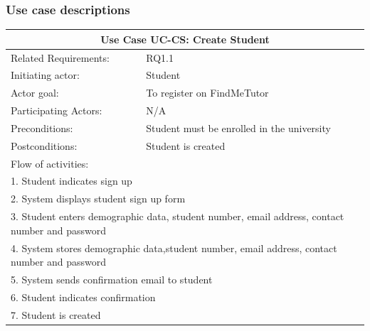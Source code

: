 \documentclass[12pt]{article}
\begin{document}
\subsubsection{Use case descriptions}

		\centering



		\begin{tabular}{| l | l| }
			\hline\multicolumn{2}{|c|}{ \textbf{Use Case UC-CS: Create Student}} \\ \hline
			Related Requirements: & RQ1.1 \\ \hline
			Initiating actor: & Student \\ \hline
			Actor goal: & To register on FindMeTutor\\ \hline
			Participating Actors: &N/A\\ \hline
			Preconditions: & Student must be enrolled in the university\\ \hline
			Postconditions: & Student is created\\ \hline
			\multicolumn{2}{|l|}{Flow of activities:}\\ \hline
			\multicolumn{2}{|p{15cm}|}{1. Student indicates sign up}\\
			\multicolumn{2}{|p{15cm}|}{2. System displays student sign up form}\\
			\multicolumn{2}{|p{15cm}|}{3. Student enters demographic data, student number, email address, contact number and password}\\
			\multicolumn{2}{|p{15cm}|}{4. System stores demographic data,student number, email address, contact number and password}\\
			\multicolumn{2}{|l|}{5. System sends confirmation email to student}\\
			\multicolumn{2}{|l|}{6. Student indicates confirmation}	\\
			\multicolumn{2}{|l|}{7. Student is created}
			\\ \hline
			\end{tabular}


\end{document}

